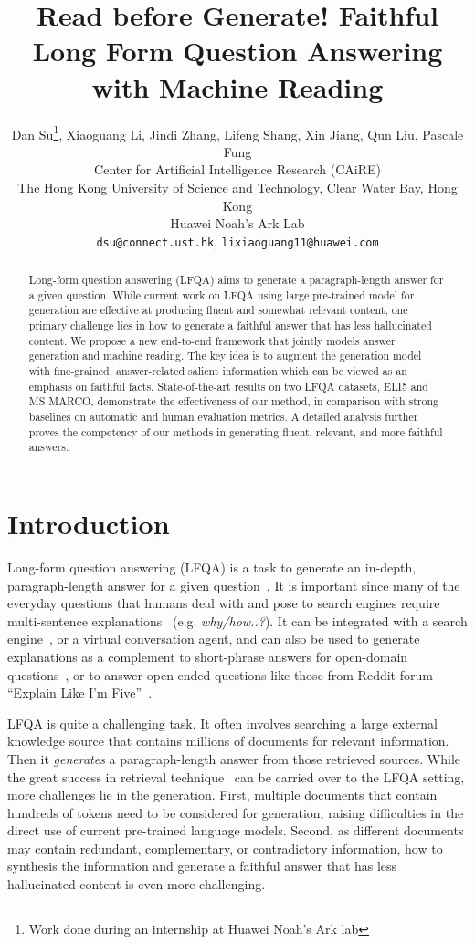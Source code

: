 \documentclass[11pt]{article}
\title{Read before Generate! Faithful Long Form Question Answering with Machine Reading}
\author{Dan Su\thanks{ Work done during an internship at Huawei Noah's Ark lab}, Xiaoguang Li, Jindi Zhang, Lifeng Shang, Xin Jiang, Qun Liu, Pascale Fung \\
Center for Artificial Intelligence Research (CAiRE)\protect\\
  The Hong Kong University of Science and Technology, Clear Water Bay, Hong Kong\\
Huawei Noah’s Ark Lab \\
\texttt{dsu@connect.ust.hk}, \texttt{lixiaoguang11@huawei.com}
}
\date{}
\begin{document}
\maketitle
\begin{abstract}
Long-form question answering (LFQA) aims to generate a paragraph-length answer for a given question. While current work on LFQA using large pre-trained model for generation are effective at producing fluent and somewhat relevant content, one primary challenge lies in how to generate a faithful answer that has less hallucinated content. We propose a new end-to-end framework that jointly models answer generation and machine reading. The key idea is to augment the generation model with fine-grained, answer-related salient information which can be viewed as an emphasis on faithful facts. State-of-the-art results on two LFQA datasets, ELI5 and MS MARCO, demonstrate the effectiveness of our method, in comparison with strong baselines on automatic and human evaluation metrics. A detailed analysis further proves the competency of our methods in generating fluent, relevant, and more faithful answers.




\end{abstract}

\section{Introduction}

Long-form question answering (LFQA) is a task to generate an in-depth, paragraph-length answer for a given question~\cite{fan2019eli5}. It is important since many of the everyday questions that humans deal with and pose to search engines require multi-sentence explanations~\cite{khashabi2021gooaq} (e.g. \textit{why/how..?}). It can be integrated with a search engine~\cite{metzler2021rethinking}, or a virtual conversation agent, and can also be used to generate explanations as a complement to short-phrase answers for open-domain questions~\cite{kwiatkowski2019natural, yang2018HotpotQA}, or to answer open-ended questions like those from Reddit forum “Explain Like I’m Five”~\cite{fan2019eli5}.




LFQA is quite a challenging task. It often involves searching a large external knowledge source that contains millions of documents for relevant information. Then it \textit{generates} a paragraph-length answer from those retrieved sources. While the great success in retrieval technique~\cite{guu2020realm, karpukhin2020dense, lee2019latent} can be carried over to the LFQA setting, more challenges lie in the generation. First, multiple documents that contain hundreds of tokens need to be considered for generation, raising difficulties in the direct use of current pre-trained language models. Second, as different documents may contain redundant, complementary, or contradictory information, how to synthesis the information and generate a faithful answer that has less hallucinated content is even more challenging.
\end{document}
